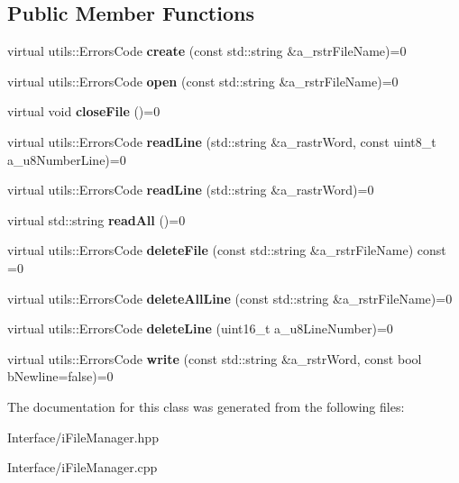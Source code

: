 \subsection*{Public Member Functions}
\begin{DoxyCompactItemize}
\item 
\mbox{\label{classi_file_manager_a7890d042838e36d3dc3794cf66eac77c}} 
virtual utils\+::\+Errors\+Code {\bfseries create} (const std\+::string \&a\+\_\+rstr\+File\+Name)=0
\item 
\mbox{\label{classi_file_manager_a7d6d813eff55c7e93b48d5321d24c443}} 
virtual utils\+::\+Errors\+Code {\bfseries open} (const std\+::string \&a\+\_\+rstr\+File\+Name)=0
\item 
\mbox{\label{classi_file_manager_afc76b1d2225e0eb34fd0aa265d1d29d9}} 
virtual void {\bfseries close\+File} ()=0
\item 
\mbox{\label{classi_file_manager_af78eff4d5a2fa4067da899733069536a}} 
virtual utils\+::\+Errors\+Code {\bfseries read\+Line} (std\+::string \&a\+\_\+rastr\+Word, const uint8\+\_\+t a\+\_\+u8\+Number\+Line)=0
\item 
\mbox{\label{classi_file_manager_a3c834f1d42dbac3866fc5b24f03b6ddf}} 
virtual utils\+::\+Errors\+Code {\bfseries read\+Line} (std\+::string \&a\+\_\+rastr\+Word)=0
\item 
\mbox{\label{classi_file_manager_adb855d60f85c9fd58ed2b51c7d58d2b1}} 
virtual std\+::string {\bfseries read\+All} ()=0
\item 
\mbox{\label{classi_file_manager_aea4f4cb1fa8e54648215cd2cfe136793}} 
virtual utils\+::\+Errors\+Code {\bfseries delete\+File} (const std\+::string \&a\+\_\+rstr\+File\+Name) const =0
\item 
\mbox{\label{classi_file_manager_a589ad05471903236a025310b0db03d6f}} 
virtual utils\+::\+Errors\+Code {\bfseries delete\+All\+Line} (const std\+::string \&a\+\_\+rstr\+File\+Name)=0
\item 
\mbox{\label{classi_file_manager_aa0e9c3395feaf9391b019b8fd7b22cf8}} 
virtual utils\+::\+Errors\+Code {\bfseries delete\+Line} (uint16\+\_\+t a\+\_\+u8\+Line\+Number)=0
\item 
\mbox{\label{classi_file_manager_a451600f528b6d4c5ac5f32cfcce96b35}} 
virtual utils\+::\+Errors\+Code {\bfseries write} (const std\+::string \&a\+\_\+rstr\+Word, const bool b\+Newline=false)=0
\end{DoxyCompactItemize}


The documentation for this class was generated from the following files\+:\begin{DoxyCompactItemize}
\item 
Interface/i\+File\+Manager.\+hpp\item 
Interface/i\+File\+Manager.\+cpp\end{DoxyCompactItemize}
